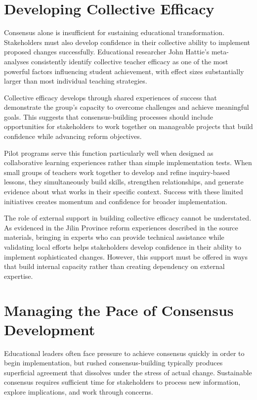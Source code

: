 \documentclass[
  Letterpaper,
]{scrbook}
\begin{document}
\section{Developing Collective
Efficacy}\label{developing-collective-efficacy}

Consensus alone is insufficient for sustaining educational
transformation. Stakeholders must also develop confidence in their
collective ability to implement proposed changes successfully.
Educational researcher John Hattie's meta-analyses consistently identify
collective teacher efficacy as one of the most powerful factors
influencing student achievement, with effect sizes substantially larger
than most individual teaching strategies.

Collective efficacy develops through shared experiences of success that
demonstrate the group's capacity to overcome challenges and achieve
meaningful goals. This suggests that consensus-building processes should
include opportunities for stakeholders to work together on manageable
projects that build confidence while advancing reform objectives.

Pilot programs serve this function particularly well when designed as
collaborative learning experiences rather than simple implementation
tests. When small groups of teachers work together to develop and refine
inquiry-based lessons, they simultaneously build skills, strengthen
relationships, and generate evidence about what works in their specific
context. Success with these limited initiatives creates momentum and
confidence for broader implementation.

The role of external support in building collective efficacy cannot be
understated. As evidenced in the Jilin Province reform experiences
described in the source materials, bringing in experts who can provide
technical assistance while validating local efforts helps stakeholders
develop confidence in their ability to implement sophisticated changes.
However, this support must be offered in ways that build internal
capacity rather than creating dependency on external expertise.

\section{Managing the Pace of Consensus
Development}\label{managing-the-pace-of-consensus-development}

Educational leaders often face pressure to achieve consensus quickly in
order to begin implementation, but rushed consensus-building typically
produces superficial agreement that dissolves under the stress of actual
change. Sustainable consensus requires sufficient time for stakeholders
to process new information, explore implications, and work through
concerns.
\end{document}
